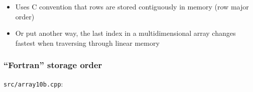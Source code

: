 \documentclass[12pt,letterpaper,twoside]{article}
\begin{document}
\begin{itemize}
\item
  Uses C convention that rows are stored contiguously in memory (row
  major order)
\item
  Or put another way, the last index in a multidimensional array changes
  fastest when traversing through linear memory
\end{itemize}

\hypertarget{fortran-storage-order}{%
\subsubsection{``Fortran'' storage order}\label{fortran-storage-order}}

\texttt{src/array10b.cpp}:

\begin{Shaded}
\begin{Highlighting}[]

  \NormalTok{, }\NormalTok{extents[}\NormalTok{][}\NormalTok{],}

  \NormalTok{;}
  \NormalTok{ (} 
    \NormalTok{ (} 
\NormalTok{    \}}
\NormalTok{  \}}

  \NormalTok{ (} 
    \StringTok{"b["}\StringTok{"] = "}
\NormalTok{  \}}

   \NormalTok{;}
\NormalTok{\}}
\end{Highlighting}
\end{Shaded}
\end{document}
